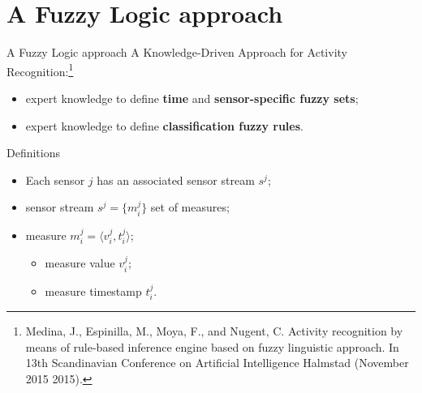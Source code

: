 \documentclass[9pt, handout]{beamer}
\begin{document}
  \section{A Fuzzy Logic approach}
    \begin{frame}{A Fuzzy Logic approach}
      \pause
      A Knowledge-Driven Approach for Activity Recognition:\footnote{Medina, J., Espinilla, M., Moya, F., and Nugent, C. Activity recognition by means of rule-based inference engine based on fuzzy linguistic approach. In 13th Scandinavian Conference on Artificial Intelligence Halmstad (November 2015 2015).}
      \pause
      \begin{itemize}
        \item expert knowledge to define \textbf{time} and \textbf{sensor-specific fuzzy sets};
        \pause
        \item expert knowledge to define \textbf{classification fuzzy rules}.
      \end{itemize}
      
      \pause
    \end{frame}
    
    \begin{frame}{Definitions}
      \pause
      \begin{itemize}
        \item Each sensor $j$ has an associated sensor stream $s^j$;
        \pause
        \item sensor stream $s^j = \{m^j_i\}$ set of measures;
        \pause
        \item measure $m^j_i = \langle v^j_i, t^j_i\rangle$;
        \begin{itemize}
          \item measure value $v^j_i$;
          \item measure timestamp $t^j_i$.
        \end{itemize} 
      \end{itemize}
    \end{frame}
    
\end{document}
